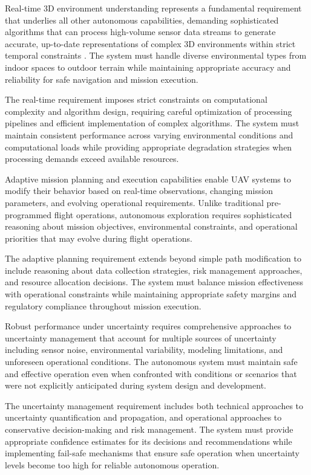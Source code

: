 Real-time 3D environment understanding represents a fundamental requirement that underlies all other autonomous capabilities, demanding sophisticated algorithms that can process high-volume sensor data streams to generate accurate, up-to-date representations of complex 3D environments within strict temporal constraints \cite{mur2015orb}. The system must handle diverse environmental types from indoor spaces to outdoor terrain while maintaining appropriate accuracy and reliability for safe navigation and mission execution.

The real-time requirement imposes strict constraints on computational complexity and algorithm design, requiring careful optimization of processing pipelines and efficient implementation of complex algorithms. The system must maintain consistent performance across varying environmental conditions and computational loads while providing appropriate degradation strategies when processing demands exceed available resources.

Adaptive mission planning and execution capabilities enable UAV systems to modify their behavior based on real-time observations, changing mission parameters, and evolving operational requirements. Unlike traditional pre-programmed flight operations, autonomous exploration requires sophisticated reasoning about mission objectives, environmental constraints, and operational priorities that may evolve during flight operations.

The adaptive planning requirement extends beyond simple path modification to include reasoning about data collection strategies, risk management approaches, and resource allocation decisions. The system must balance mission effectiveness with operational constraints while maintaining appropriate safety margins and regulatory compliance throughout mission execution.

Robust performance under uncertainty requires comprehensive approaches to uncertainty management that account for multiple sources of uncertainty including sensor noise, environmental variability, modeling limitations, and unforeseen operational conditions. The autonomous system must maintain safe and effective operation even when confronted with conditions or scenarios that were not explicitly anticipated during system design and development.

The uncertainty management requirement includes both technical approaches to uncertainty quantification and propagation, and operational approaches to conservative decision-making and risk management. The system must provide appropriate confidence estimates for its decisions and recommendations while implementing fail-safe mechanisms that ensure safe operation when uncertainty levels become too high for reliable autonomous operation.

